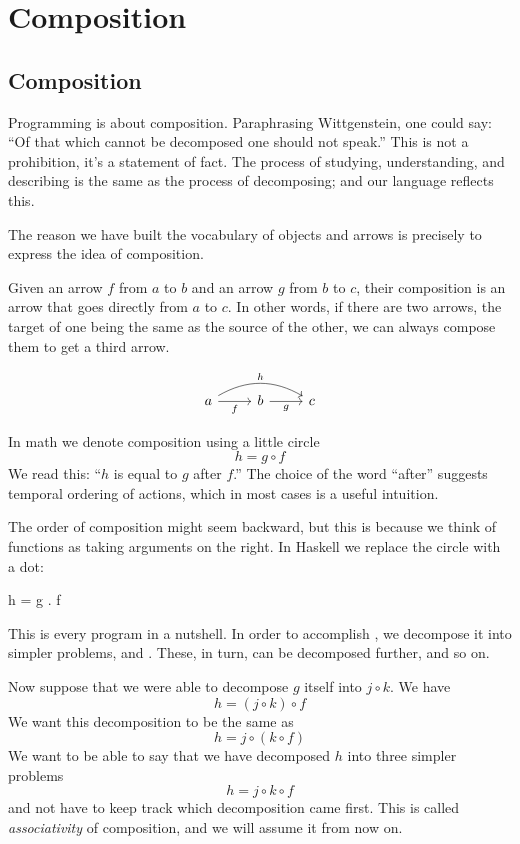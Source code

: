 \documentclass[DaoFP]{subfiles}
\begin{document}
\setcounter{chapter}{1}
\chapter{Composition}

\section{Composition}

Programming is about composition. Paraphrasing Wittgenstein, one could say: ``Of that which cannot be decomposed one should not speak.'' This is not a prohibition, it's a statement of fact. The process of studying, understanding, and describing is the same as the process of decomposing; and our language reflects this. 

The reason we have built the vocabulary of objects and arrows is precisely to express the idea of composition.  

Given an arrow $f$ from $a$ to $b$ and an arrow $g$ from $b$ to $c$, their composition is an arrow that goes directly from $a$ to $c$. In other words, if there are two arrows, the target of one being the same as the source of the other, we can always compose them to get a third arrow.

\[
 \begin{tikzcd}
 a
 \arrow[rr, bend left, "h"]
 \arrow[r, "f"']
 & b
 \arrow[r, "g"']
& c
 \end{tikzcd}
\]

In math we denote composition using a little circle
\[h = g \circ f\]
We read this: ``$h$ is equal to $g$ after $f$.'' The choice of the word ``after'' suggests temporal ordering of actions, which in most cases is a useful intuition.

The order of composition might seem backward, but this is because we think of functions as taking arguments on the right.
In Haskell we replace the circle with a dot:
\begin{haskell}
h = g . f
\end{haskell}
This is every program in a nutshell. In order to accomplish , we decompose it into simpler problems,  and . These, in turn, can be decomposed further, and so on.

Now suppose that we were able to decompose $g$ itself into $j \circ k$. We have
\[h = (j \circ k) \circ f\]
We want this decomposition to be the same as
\[h = j \circ (k \circ f)\]
We want to be able to say that we have decomposed $h$ into three simpler problems
\[h =  j \circ k \circ f\]
and not have to keep track which decomposition came first. This is called \emph{associativity} of composition, and we will assume it from now on.
\end{document}
